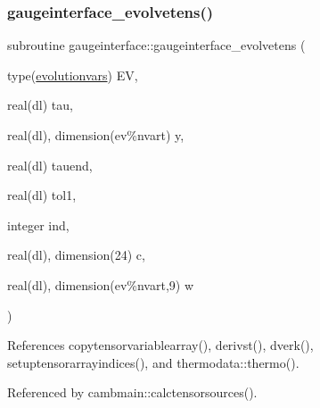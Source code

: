 \subsubsection{\texorpdfstring{gaugeinterface\+\_\+evolvetens()}{gaugeinterface\_evolvetens()}}
{\footnotesize\ttfamily subroutine gaugeinterface\+::gaugeinterface\+\_\+evolvetens (\begin{DoxyParamCaption}\item[{type(\mbox{\hyperlink{structgaugeinterface_1_1evolutionvars}{evolutionvars}})}]{EV,  }\item[{real(dl)}]{tau,  }\item[{real(dl), dimension(ev\%nvart)}]{y,  }\item[{real(dl)}]{tauend,  }\item[{real(dl)}]{tol1,  }\item[{integer}]{ind,  }\item[{real(dl), dimension(24)}]{c,  }\item[{real(dl), dimension(ev\%nvart,9)}]{w }\end{DoxyParamCaption})}



References copytensorvariablearray(), derivst(), dverk(), setuptensorarrayindices(), and thermodata\+::thermo().



Referenced by cambmain\+::calctensorsources().

